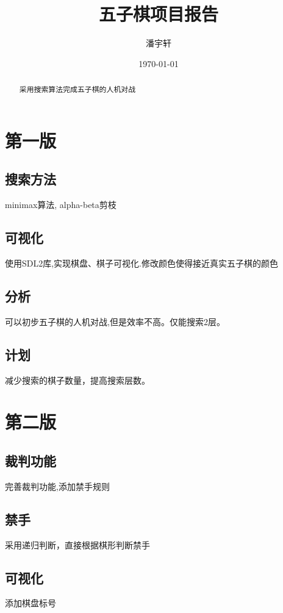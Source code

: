 \documentclass[a4paper,12pt]{ctexart}
\title{五子棋项目报告}
\author{潘宇轩}
\date{\today}
\begin{document}
\maketitle

\begin{abstract}
    采用搜索算法完成五子棋的人机对战
\end{abstract}

\tableofcontents
\section{第一版}

\subsection{搜索方法}

minimax算法, alpha-beta剪枝

\subsection{可视化}
使用SDL2库,实现棋盘、棋子可视化.修改颜色使得接近真实五子棋的颜色

\subsection{分析}
可以初步五子棋的人机对战,但是效率不高。仅能搜索2层。

\subsection{计划}
减少搜索的棋子数量，提高搜索层数。

\section{第二版}

\subsection{裁判功能}
完善裁判功能,添加禁手规则

\subsection{禁手}
采用递归判断，直接根据棋形判断禁手

\subsection{可视化}
添加棋盘标号
\end{document}
